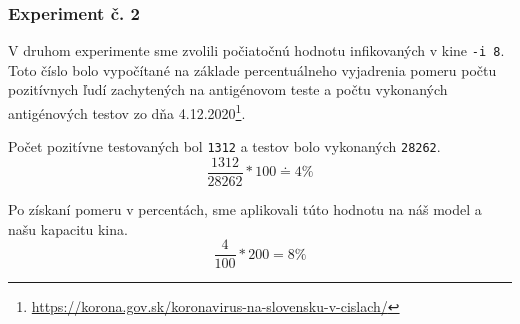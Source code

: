 \documentclass[a4paper, 11pt]{article}
\begin{document}
        \par
        
        \subsubsection{Experiment č. 2}
        \label{sec:ex.2}
            V druhom experimente sme zvolili počiatočnú hodnotu infikovaných v kine \texttt{-i 8}. Toto číslo bolo vypočítané na základe percentuálneho vyjadrenia pomeru počtu pozitívnych ľudí zachytených na antigénovom teste a počtu vykonaných antigénových testov zo dňa 4.12.2020\footnote{\href{https://korona.gov.sk/koronavirus-na-slovensku-v-cislach/}{https://korona.gov.sk/koronavirus-na-slovensku-v-cislach/}}.
            
            \par Počet pozitívne testovaných bol \texttt{1312} a testov bolo vykonaných \texttt{28262}.
            $$ \frac{1312}{28262} * 100 \doteq 4\% $$
            
            \par Po získaní pomeru v percentách, sme aplikovali túto hodnotu na náš model a našu kapacitu kina.
            $$ \frac{4}{100} * 200 = 8\% $$
            
            \begin{table}[h]
        \end{table}
        
\end{document}
